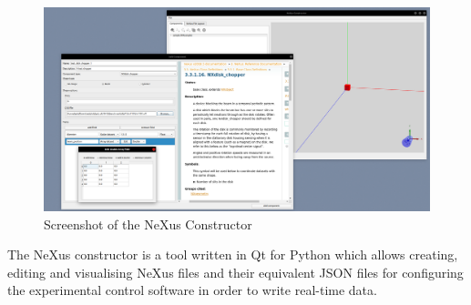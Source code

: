 \begin{figure}
\caption{Screenshot of the NeXus Constructor}
\includegraphics[width=\linewidth]{screenshot.png}
\end{figure}

The NeXus constructor is a tool written in Qt for Python which allows creating, editing and visualising NeXus files and their equivalent JSON files for configuring the experimental control software in order to write real-time data. 
